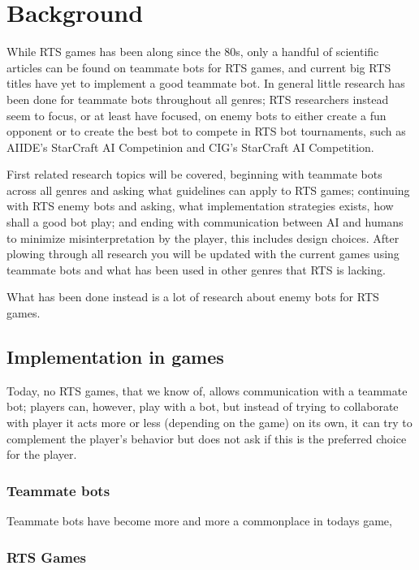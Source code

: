 \chapter{Background}
While RTS games has been along since the 80s\cite{adams06, rtsHistory}, only a handful of scientific articles can be found on teammate bots for RTS games, and current big RTS titles have yet to implement a good teammate bot. In general little research has been done for teammate bots throughout all genres; RTS researchers instead seem to focus, or at least have focused, on enemy bots to either create a fun opponent
or to create the best bot to compete in RTS bot tournaments, such as  AIIDE's StarCraft AI Competinion\cite{scaiide} and CIG's StarCraft AI Competition\cite{sccig}.

First related research topics will be covered, beginning with teammate bots across all genres and asking what guidelines can apply to RTS games; continuing with RTS enemy bots and asking, what implementation strategies exists, how shall a good bot play; and ending with communication between AI and humans to minimize misinterpretation by the player, this includes design choices. After plowing through all research you will be updated with the current games using teammate bots and what has been used in other genres that RTS is lacking.

What has been done instead is a lot of research about enemy bots for RTS games. 




\section{Implementation in games}


Today, no RTS games, that we know of, allows communication with a teammate bot; players can, however, play with a bot, but instead of trying to collaborate with player it acts more or less (depending on the game) on its own, it can try to complement the player's behavior but does not ask if this is the preferred choice for the player.


\subsection{Teammate bots}
Teammate bots have become more and more a commonplace in todays game, 

\subsection{RTS Games}